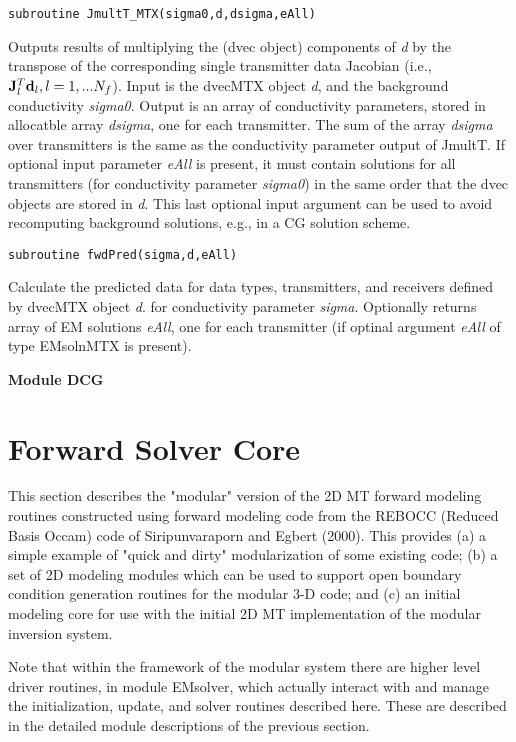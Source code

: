 \documentclass[12pt]{article}
\begin{document}
\begin{verbatim}
subroutine JmultT_MTX(sigma0,d,dsigma,eAll)
\end{verbatim}

Outputs results of multiplying 
the (dvec object) components of {\it d} by the
transpose of the corresponding single transmitter data Jacobian
(i.e., ${\bf J}_l^T {\bf d}_l, l = 1, ... N_f$).
Input is the dvecMTX object {\it d}, and the background
conductivity {\it sigma0}.
Output is an array of conductivity parameters,
stored in allocatble array {\it dsigma}, one for each transmitter.  
The sum of the array {\it dsigma} over transmitters is the same as the 
conductivity parameter output of JmultT.
If optional input parameter {\it eAll} is present, it must contain
solutions for all transmitters (for conductivity parameter
{\it sigma0}) in the same order that the dvec objects are stored
in {\it d}.  This last optional input argument can be used to avoid 
recomputing background solutions, e.g., in a CG solution scheme.

\begin{verbatim}
subroutine fwdPred(sigma,d,eAll)
\end{verbatim}

Calculate the predicted data for data types,
transmitters, and receivers defined by dvecMTX object {\it d}.
for conductivity parameter {\it sigma}.
Optionally returns array of EM solutions {\it eAll}, one for
each transmitter (if optinal argument {\it eAll} of type 
EMsolnMTX is present).

\vspace{10pt}

\noindent
{\bf Module DCG}

\section{Forward Solver Core}

This section describes the "modular" version of
the 2D MT forward modeling routines constructed
using forward modeling code from the REBOCC (Reduced
Basis Occam) code of Siripunvaraporn and Egbert (2000).
This provides (a) a simple example of "quick and
dirty" modularization of some existing code; (b) a set of
2D modeling modules which can be used to support open
boundary condition generation routines for the modular
3-D code; and (c) an initial modeling core for use
with the initial 2D MT implementation of the modular 
inversion system.

Note that within the framework of the modular system
there are higher level driver routines, in module EMsolver,
which actually interact with and manage the initialization,
update, and solver routines described here.  These are
described in the detailed module descriptions of the
previous section.
\end{document}
